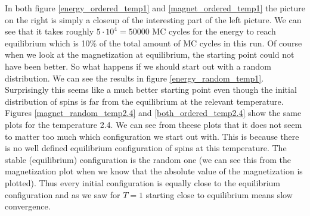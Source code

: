 \documentclass[a4paper,english, 10pt, twoside]{article}
\begin{document}
In both figure \ref{energy_ordered_temp1} and \ref{magnet_ordered_temp1} the picture on the right is simply a closeup of 
the interesting part of the left picture. We can see that it takes roughly $5\cdot10^4 = 50 000$ MC cycles for the energy to 
reach equilibrium which is 10\% of the total amount of MC cycles in this run. Of course when we look at the magnetization 
at equilibrium, the starting point could not have been better. So what happens if we should start out with a random distribution. 
We can see the results in figure \ref{energy_random_temp1}. Surprisingly this seems like a much better starting point even though
the initial distribution of spins is far from the equilibrium at the relevant temperature. Figures \ref{magnet_random_temp2.4}
and \ref{both_ordered_temp2.4} show the same plots for the temperature 2.4. We can see from theese plots that it does not seem 
to matter too much which configuration we start out with. This is because there is no well defined equilibrium configuration of 
spins at this temperature. The stable (equilibrium) configuration is the random one (we can see this from the magnetization plot 
when we know that the absolute value of the magnetization is plotted). Thus every initial configuration is equally close to the 
equilibrium configuration and as we saw for $T = 1$ starting close to equilibrium means slow convergence.
\end{document}
